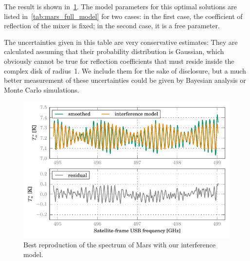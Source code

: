 The result is shown in~\cref{fig:mars_25_interf_smoothed_vs_interf}.
The model parameters for this optimal solutions are listed in~\cref{tab:mars_full_model} for two cases:
in the first case, the coefficient of reflection of the mixer is fixed;
in the second case, it is a free parameter.

The uncertainties given in this table are very conservative estimates:
They are calculated assuming that their probability distribution is Gaussian, which obviously cannot be true for reflection coefficients that must reside inside the complex disk of radius~1.
We include them for the sake of disclosure, but a much better measurement of these uncertainties could be given by Bayesian analysis or Monte Carlo simulations.

\begin{figure}
    \centering
    \includegraphics{mars_25_interf_smoothed_vs_interf}
    \caption{Best reproduction of the spectrum of Mars with our interference model.}
    \label{fig:mars_25_interf_smoothed_vs_interf}
\end{figure}

